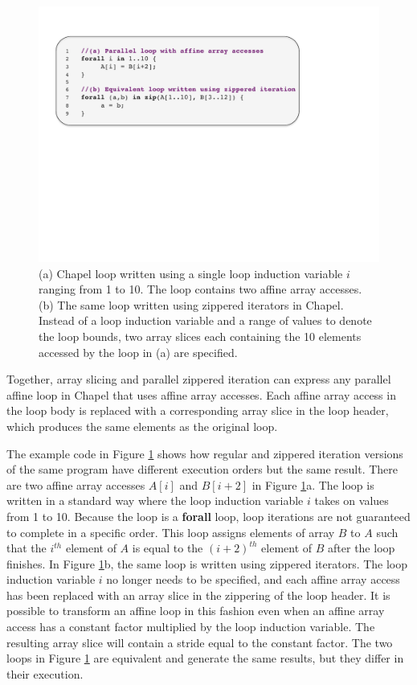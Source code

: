 \begin{figure}
\begin{center}
\includegraphics[width=\linewidth]{./Figures/affine_loop}
\caption{(a) Chapel loop written using a single loop induction variable $i$ ranging from 1 to 10. The loop contains two affine array accesses. (b) The same loop written using zippered iterators in Chapel. Instead of a loop induction variable and a range of values to denote the loop bounds, two array slices each containing the 10 elements accessed by the loop in (a) are specified.}
\label{affine_loop}
\end{center}
\end{figure}

Together, array slicing and parallel zippered iteration can express any parallel affine loop in Chapel that uses affine array accesses. Each affine array access in the loop body is replaced with a corresponding array slice in the loop header, which produces the same elements as the original loop. 

The example code in Figure \ref{affine_loop} shows how regular and zippered iteration versions of the same program have different execution orders but the same result. There are two affine array accesses $A[i]$ and $B[i+2]$ in Figure \ref{affine_loop}a. The loop is written in a standard way where the loop induction variable $i$ takes on values from 1 to 10. Because the loop is a \textbf{forall} loop, loop iterations are not guaranteed to complete in a specific order. This loop assigns elements of array $B$ to $A$ such that the $i^{th}$ element of $A$ is equal to the $(i+2)^{th}$ element of $B$ after the loop finishes. In Figure \ref{affine_loop}b, the same loop is written using zippered iterators. The loop induction variable $i$ no longer needs to be specified, and each affine array access has been replaced with an array slice in the zippering of the loop header. It is possible to transform an affine loop in this fashion even when an affine array access has a constant factor multiplied by the loop induction variable. The resulting array slice will contain a stride equal to the constant factor. The two loops in Figure \ref{affine_loop} are equivalent and generate the same results, but they differ in their execution.

